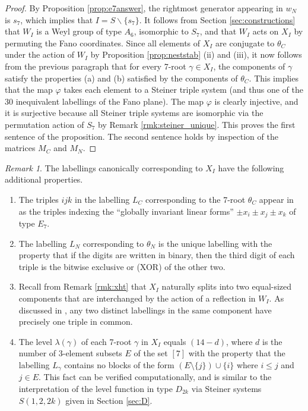 \documentclass[11pt]{amsart}
\theoremstyle{plain}
\theoremstyle{definition}
\theoremstyle{remark}
\newtheorem{rmk}[theorem]{Remark}
\numberwithin{equation}{subsection}
\begin{document}
\begin{proof}
By Proposition \ref{prop:e7answer}, the rightmost generator appearing in $w_N$
is $s_7$, which implies that $I = S \backslash \{s_7\}$. It follows from Section
\ref{sec:constructions} that $W_I$ is a Weyl group of type $A_6$, isomorphic to
$S_7$, and that $W_I$ acts on $X_I$ by permuting the Fano coordinates. Since all
elements of $X_I$ are conjugate to $\theta_C$ under the action of $W_I$ by
Proposition \ref{prop:neststab} (ii) and (iii), it now follows from the previous
paragraph that for every 7-root $\gamma\in X_I$, the components of $\gamma$
satisfy the properties (a) and (b) satisfied by the components of $\theta_C$.
This implies that the map $\varphi$ takes each element to a Steiner triple
system (and thus one of the 30 inequivalent labellings of the Fano plane).  The
map $\varphi$ is clearly injective, and it is surjective because all Steiner
triple systems are isomorphic via the permutation action of $S_7$ by Remark
\ref{rmk:steiner_unique}. This proves the first sentence of the proposition. The
second sentence holds by inspection of the matrices $M_C$ and $M_N$.
\end{proof}

\begin{rmk}\label{rmk:labellings}
The labellings canonically corresponding to $X_I$ have the following additional
properties.
\begin{enumerate}
    \item[{\rm (i)}] The triples $ijk$ in the labelling $L_C$ corresponding to
         the 7-root $\theta_C$ appear in \cite[Section IV]{talamini10} as the
         triples indexing the ``globally invariant linear forms'' $\pm x_i\pm
         x_j\pm x_k$ of type $E_7$.

\item [{\rm (ii)}] The labelling $L_N$ corresponding to $\theta_N$ is the unique
        labelling with the property that if the digits are written in binary, then the third
  digit of each triple is the bitwise exclusive or (XOR) of the other two.
  \item[{\rm (iii)}] Recall from Remark \ref{rmk:xht} that
       $X_I$ naturally splits into two equal-sized components that are
       interchanged by the action of a reflection in $W_I$. As discussed in
       \cite{saniga16}, any two distinct labellings in the same component have
       precisely one triple in common.
   \item[{\rm (iv)}] The level $\lambda(\gamma)$ of each 7-root $\gamma$ in
       $X_I$ equals $(14-d)$, where $d$ is the number of 3-element subsets $E$ of
        the set $[7]$ with the property that the labelling $L_\gamma$ contains
        no blocks of the form $(E\setminus\{j\})\cup \{i\}$ where $i\le j$ and
        $j\in E$. This fact can be verified computationally, and is similar to
        the interpretation of the level function in type $D_{2k}$ via Steiner
        systems $S(1,2,2k)$ given in Section \ref{sec:D}.
\end{enumerate}
\end{rmk}
\end{document}
